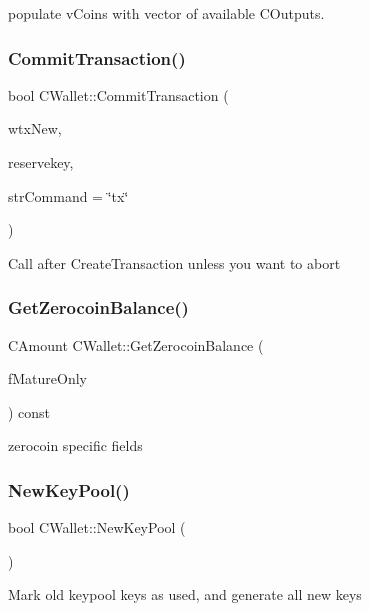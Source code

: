 populate v\+Coins with vector of available C\+Outputs. \mbox{\label{group___actions_gaa13fbeaebd271f910a54cc5b82d73fde}} 
\subsubsection{\texorpdfstring{CommitTransaction()}{CommitTransaction()}}
{\footnotesize\ttfamily bool C\+Wallet\+::\+Commit\+Transaction (\begin{DoxyParamCaption}\item[{\mbox{\hyperlink{class_c_wallet_tx}{C\+Wallet\+Tx}} \&}]{wtx\+New,  }\item[{\mbox{\hyperlink{class_c_reserve_key}{C\+Reserve\+Key}} \&}]{reservekey,  }\item[{std\+::string}]{str\+Command = {\ttfamily \char`\"{}tx\char`\"{}} }\end{DoxyParamCaption})}

Call after Create\+Transaction unless you want to abort \mbox{\label{group___actions_gaba22138d6c6eabe35feed7570a78ee7d}} 
\subsubsection{\texorpdfstring{GetZerocoinBalance()}{GetZerocoinBalance()}}
{\footnotesize\ttfamily C\+Amount C\+Wallet\+::\+Get\+Zerocoin\+Balance (\begin{DoxyParamCaption}\item[{bool}]{f\+Mature\+Only }\end{DoxyParamCaption}) const}

zerocoin specific fields \mbox{\label{group___actions_ga7353ba1e79fc4167fbfbe79b41698fa7}} 
\subsubsection{\texorpdfstring{NewKeyPool()}{NewKeyPool()}}
{\footnotesize\ttfamily bool C\+Wallet\+::\+New\+Key\+Pool (\begin{DoxyParamCaption}{ }\end{DoxyParamCaption})}

Mark old keypool keys as used, and generate all new keys 